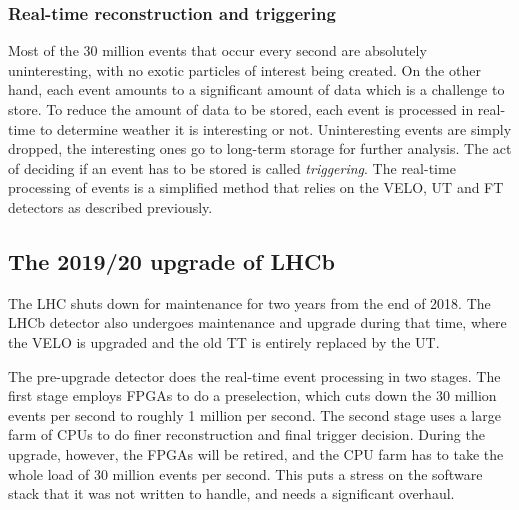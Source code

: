 \documentclass[12pt]{article}
\begin{document}
\subsubsection{Real-time reconstruction and triggering}\label{sec_trigger_what}

Most of the 30 million events that occur every second are absolutely uninteresting, with no exotic particles of interest being created. On the other hand, each event amounts to a significant amount of data which is a challenge to store. To reduce the amount of data to be stored, each event is processed in real-time to determine weather it is interesting or not. Uninteresting events are simply dropped, the interesting ones go to long-term storage for further analysis. The act of deciding if an event has to be stored is called \textit{triggering}. The real-time processing of events is a simplified method that relies on the VELO, UT and FT detectors as described previously.


\subsection{The 2019/20 upgrade of LHCb}\label{sec_lhcb_upgrade}

The LHC shuts down for maintenance for two years from the end of 2018. The LHCb detector also undergoes maintenance and upgrade during that time, where the VELO is upgraded and the old TT is entirely replaced by the UT.

The pre-upgrade detector does the real-time event processing in two stages. The first stage employs FPGAs to do a preselection, which cuts down the 30 million events per second to roughly 1 million per second. The second stage uses a large farm of CPUs to do finer reconstruction and final trigger decision. During the upgrade, however, the FPGAs will be retired, and the CPU farm has to take the whole load of 30 million events per second. This puts a stress on the software stack that it was not written to handle, and needs a significant overhaul.
\end{document}
